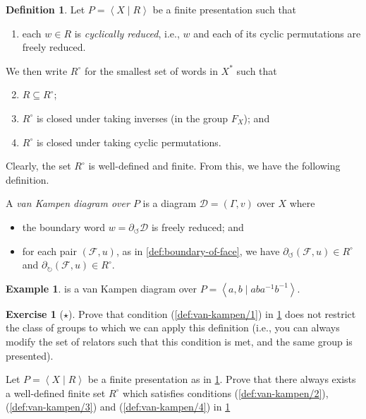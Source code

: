 \documentclass[11pt,a4paper,reqno]{amsart}
\theoremstyle{plain}
\theoremstyle{definition}
\newtheorem{definition}[theorem]{Definition}
\theoremstyle{definition}
\newtheorem{exercise}[theorem]{Exercise}
\newtheorem{example}[theorem]{Example}
\newcommand\exerciseLevelEasy{$\star$}
\begin{document}
\begin{definition}\label{def:van-kampen}
  Let $P = \left\langle X \mid R\right\rangle$ be a finite presentation such that
  \begin{enumerate}[leftmargin=2em]
    \item\label{def:van-kampen/1} each $w\in R$ is \textit{cyclically reduced}, i.e., $w$ and each of its cyclic permutations are freely reduced.
  \end{enumerate}
  We then write $R^\circ$ for the smallest set of words in $X^*$ such that
  \begin{enumerate}[leftmargin=2em]\setcounter{enumi}{1}
    \item\label{def:van-kampen/2} $R\subseteq R^\circ$;
    \item\label{def:van-kampen/3} $R^\circ$ is closed under taking inverses (in the group $F_X$); and
    \item\label{def:van-kampen/4} $R^\circ$ is closed under taking cyclic permutations.
  \end{enumerate}
  Clearly, the set $R^\circ$ is well-defined and finite. From this, we have the following definition.

  \hrulefill

  A \emph{van Kampen diagram over $P$} is a diagram $\mathcal D = (\Gamma,v)$ over $X$ where
  \begin{itemize}[leftmargin=2em]
    \item the boundary word $w = \partial_{\circlearrowleft} \mathcal D$ is freely reduced; and
    \item for each pair $(\mathcal F,u)$, as in \cref{def:boundary-of-face}, we have $\partial_{\circlearrowleft} (\mathcal F,u)\in R^\circ$ and $\partial_{\circlearrowright} (\mathcal F,u) \in R^\circ$.
    \end{itemize}
\end{definition}
\begin{example}
   is a van Kampen diagram over $P = \left\langle a,b \mid aba^{-1}b^{-1} \right\rangle$.
\end{example}
\begin{exercise}[\exerciseLevelEasy]
  Prove that condition (\ref{def:van-kampen/1}) in \cref{def:van-kampen} does not restrict the class of groups to which we can apply this definition (i.e., you can always modify the set of relators such that this condition is met, and the same group is presented).

  \smallskip

  Let $P = \left\langle X\mid R\right\rangle$ be a finite presentation as in \cref{def:van-kampen}.
  Prove that there always exists a well-defined finite set $R^\circ$ which satisfies conditions (\ref{def:van-kampen/2}), (\ref{def:van-kampen/3}) and (\ref{def:van-kampen/4}) in \cref{def:van-kampen}
\end{exercise}
\end{document}
